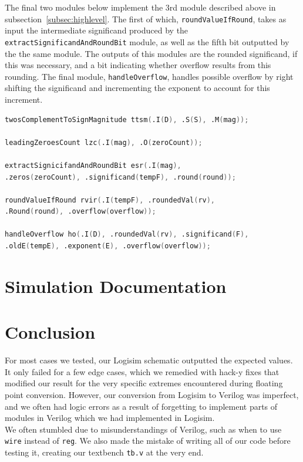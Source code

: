 \documentclass[]{article}
\begin{document}
The final two modules below implement the 3rd module described above in subsection~\ref{subsec:highlevel}. The first of which, \texttt{roundValueIfRound}, takes as input the intermediate significand produced by the \texttt{extractSignificand\-AndRoundBit} module, as well as the fifth bit outputted by the the same module. The outputs of this modules are the rounded significand, if this was necessary, and a bit indicating whether overflow results from this rounding. The final module, \texttt{handleOverflow}, handles possible overflow by right shifting the significand and incrementing the exponent to account for this increment.

\begin{lstlisting}[frame=single, language=verilog, caption= Excerpt from main \texttt{fpcvt.v} module.]
twosComplementToSignMagnitude ttsm(.I(D), .S(S), .M(mag));
    
leadingZeroesCount lzc(.I(mag), .O(zeroCount));
    
extractSignicifandAndRoundBit esr(.I(mag), 
.zeros(zeroCount), .significand(tempF), .round(round));

roundValueIfRound rvir(.I(tempF), .roundedVal(rv), 
.Round(round), .overflow(overflow));

handleOverflow ho(.I(D), .roundedVal(rv), .significand(F), 
.oldE(tempE), .exponent(E), .overflow(overflow));
\end{lstlisting}

\section{Simulation Documentation}
\section{Conclusion}
For most cases we tested, our Logisim schematic outputted the expected values. It only failed for a few edge cases, which we remedied with hack-y fixes that modified our result for the very specific extremes encountered during floating point conversion. However, our conversion from Logisim to Verilog was imperfect, and we often had logic errors as a result of forgetting to implement parts of modules in Verilog which we had implemented in Logisim.\\

We often stumbled due to misunderstandings of Verilog, such as when to use \texttt{wire} instead of \texttt{reg}. We also made the mistake of writing all of our code before testing it, creating our textbench \texttt{tb.v} at the very end.
\end{document}
